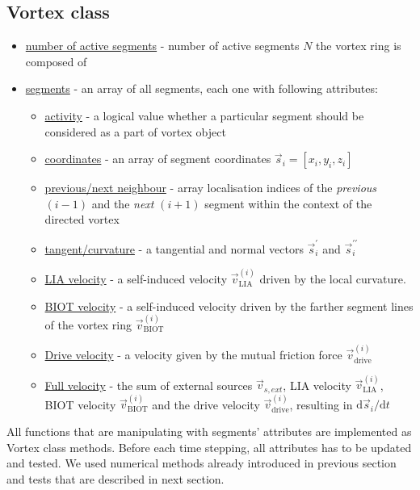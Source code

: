 \subsection*{Vortex class}

\begin{itemize}
	\item \underline{number of active segments} - number of active segments $N$ the vortex ring is composed of
	\item \underline{segments} - an array of all segments, each one with following attributes:
	\begin{itemize}
		\item \underline{activity} - a logical value whether a particular segment should be considered as a part of vortex object
		\item \underline{coordinates} - an array of segment coordinates $\vec{s}_i = [x_i,y_i,z_i]$
		\item \underline{previous/next neighbour} - array localisation indices of the \textit{previous} $(i-1)$ and the \textit{next} $(i+1)$ segment within the context of the directed vortex
		\item \underline{tangent/curvature} - a tangential and normal vectors $\vec{s}^{\prime}_i$ and $\vec{s}^{\prime\prime}_i$

		\item \underline{LIA velocity} - a self-induced velocity $\vec{v}_{\text{LIA}}^{(i)}$ driven by the local curvature.
		\item \underline{BIOT velocity} - a self-induced velocity driven by the farther segment lines of the vortex ring $\vec{v}_{\text{BIOT}}^{(i)}$

		\item \underline{Drive velocity} - a velocity given by the mutual friction force $\vec{v}_{\text{drive}}^{(i)}$
		\item \underline{Full velocity} - the sum of external sources $\vec{v}_{s,ext}$, LIA velocity $\vec{v}_{\text{LIA}}^{(i)}$, BIOT velocity $\vec{v}_{\text{BIOT}}^{(i)}$ and the drive velocity $\vec{v}_{\text{drive}}^{(i)}$, resulting in $\text{d}\vec{s}_i / \text{d}t$
	\end{itemize}
\end{itemize}

All functions that are manipulating with segments' attributes are implemented as Vortex class methods. Before each time stepping, all attributes has to be updated and tested. We used numerical methods already introduced in previous section and tests that are described in next section.

